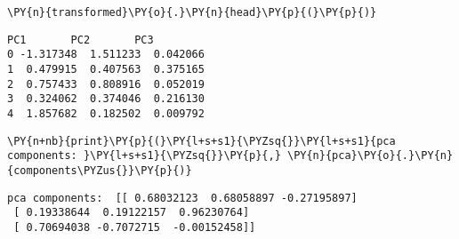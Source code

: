     \begin{tcolorbox}[breakable, size=fbox, boxrule=1pt, pad at break*=1mm,colback=cellbackground, colframe=cellborder]
\begin{Verbatim}[commandchars=\\\{\}]
\PY{n}{transformed}\PY{o}{.}\PY{n}{head}\PY{p}{(}\PY{p}{)}
\end{Verbatim}
\end{tcolorbox}

            \begin{tcolorbox}[breakable, size=fbox, boxrule=.5pt, pad at break*=1mm, opacityfill=0]
\begin{Verbatim}[commandchars=\\\{\}]
        PC1       PC2       PC3
0 -1.317348  1.511233  0.042066
1  0.479915  0.407563  0.375165
2  0.757433  0.808916  0.052019
3  0.324062  0.374046  0.216130
4  1.857682  0.182502  0.009792
\end{Verbatim}
\end{tcolorbox}
        
    \begin{tcolorbox}[breakable, size=fbox, boxrule=1pt, pad at break*=1mm,colback=cellbackground, colframe=cellborder]
\begin{Verbatim}[commandchars=\\\{\}]
\PY{n+nb}{print}\PY{p}{(}\PY{l+s+s1}{\PYZsq{}}\PY{l+s+s1}{pca components: }\PY{l+s+s1}{\PYZsq{}}\PY{p}{,} \PY{n}{pca}\PY{o}{.}\PY{n}{components\PYZus{}}\PY{p}{)}
\end{Verbatim}
\end{tcolorbox}

    \begin{Verbatim}[commandchars=\\\{\}]
pca components:  [[ 0.68032123  0.68058897 -0.27195897]
 [ 0.19338644  0.19122157  0.96230764]
 [ 0.70694038 -0.7072715  -0.00152458]]
    \end{Verbatim}

